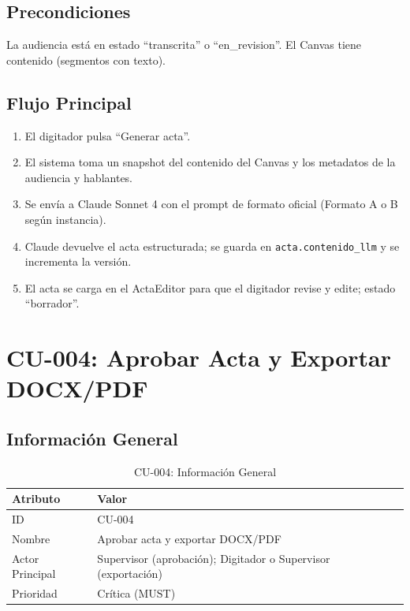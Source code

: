 \documentclass[12pt,a4paper]{report}
\begin{document}
\subsection{Precondiciones}

La audiencia está en estado ``transcrita'' o ``en\_revision''. El Canvas tiene contenido (segmentos con texto).

\subsection{Flujo Principal}

\begin{enumerate}
    \item El digitador pulsa ``Generar acta''.
    \item El sistema toma un snapshot del contenido del Canvas y los metadatos de la audiencia y hablantes.
    \item Se envía a Claude Sonnet 4 con el prompt de formato oficial (Formato A o B según instancia).
    \item Claude devuelve el acta estructurada; se guarda en \texttt{acta.contenido\_llm} y se incrementa la versión.
    \item El acta se carga en el ActaEditor para que el digitador revise y edite; estado ``borrador''.
\end{enumerate}

\section{CU-004: Aprobar Acta y Exportar DOCX/PDF}

\subsection{Información General}

\begin{table}[H]
\centering
\small
\begin{tabular}{|p{3.5cm}|p{9.5cm}|}
\hline
\rowcolor{primaryblue!20}
\textbf{Atributo} & \textbf{Valor} \\
\hline
ID & CU-004 \\
\hline
Nombre & Aprobar acta y exportar DOCX/PDF \\
\hline
Actor Principal & Supervisor (aprobación); Digitador o Supervisor (exportación) \\
\hline
Prioridad & Crítica (MUST) \\
\hline
\end{tabular}
\caption{CU-004: Información General}
\end{table}
\end{document}
